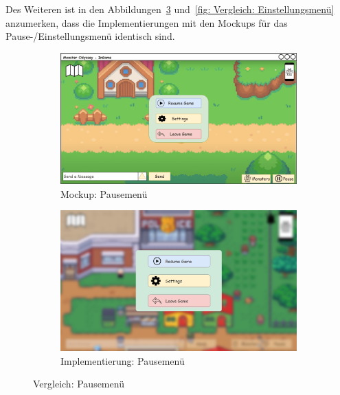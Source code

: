 Des Weiteren ist in den Abbildungen~\ref{fig: Vergleich: Pausemenü} und~\ref{fig: Vergleich: Einstellungsmenü} anzumerken, dass die Implementierungen mit den Mockups für das Pause-/Einstellungsmenü identisch sind. 
\begin{figure}[H]
    \centering
    \begin{subfigure}[b]{0.4\textwidth}
        \includegraphics[width=\textwidth]{images/mockups/Bonusfeatures/AudioIngame/IngameSettings.png}
        \caption{Mockup: Pausemenü}
        \label{fig: Mockup: Pausemenü}
    \end{subfigure}
    \hfill
    \begin{subfigure}[b]{0.4\textwidth}
        \includegraphics[width=\textwidth]{images/implementation/Bonusfeatures/AudioIngame/Pausemenu imp.png}
        \caption{Implementierung: Pausemenü}
        \label{fig: Implementierung: Pausemenü}
    \end{subfigure}
    \caption{Vergleich: Pausemenü}
    \label{fig: Vergleich: Pausemenü}
\end{figure}
